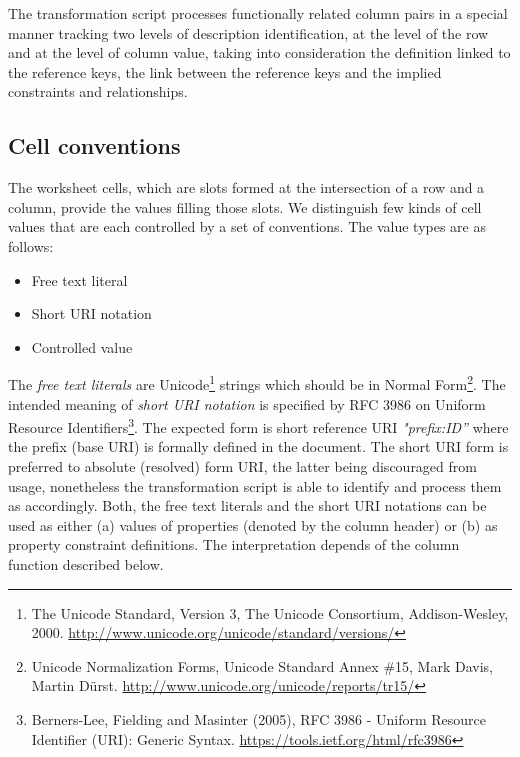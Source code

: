 The transformation script processes functionally related column pairs in a special manner tracking two levels of description identification, at the level of the row and at the level of column value, taking into consideration the definition linked to the reference keys, the link between the reference keys and the implied constraints and relationships.

\subsection{Cell conventions}

The worksheet cells, which are slots formed at the intersection of a row and a column, provide the values filling those slots. We distinguish few kinds of cell values that are each controlled by a set of conventions. The value types are as follows:

\begin{itemize}

\item
  Free text literal
\item
  Short URI notation
\item
  Controlled value
\end{itemize}

The \textit{free text literals} are
Unicode\footnote{The Unicode Standard,
	Version 3, The Unicode Consortium, Addison-Wesley, 2000.
	\mbox{\url{http://www.unicode.org/unicode/standard/versions/}} } strings which
should be in Normal Form\footnote{Unicode Normalization
	Forms, Unicode Standard Annex \#15, Mark Davis, Martin Dürst.
	\href{http://www.unicode.org/unicode/reports/tr15/\%20}{http://www.unicode.org/unicode/reports/tr15/}}.
	The intended meaning of \textit{short URI notation} is specified by RFC 3986 on Uniform Resource
Identifiers\footnote{Berners-Lee, Fielding
	and Masinter (2005), RFC 3986 - Uniform Resource Identifier (URI):
	Generic Syntax. \url{https://tools.ietf.org/html/rfc3986}}. The
expected form is short reference URI \emph{"prefix:ID'' } where the
prefix (base URI) is formally defined in the document. The short URI
form is preferred to absolute (resolved) form URI, the latter being
discouraged from usage, nonetheless the transformation script is able to
identify and process them as accordingly. Both, the free text literals
and the short URI notations can be used as either (a) values of
properties (denoted by the column header) or (b) as property constraint
definitions. The interpretation depends of the column function described
below.

